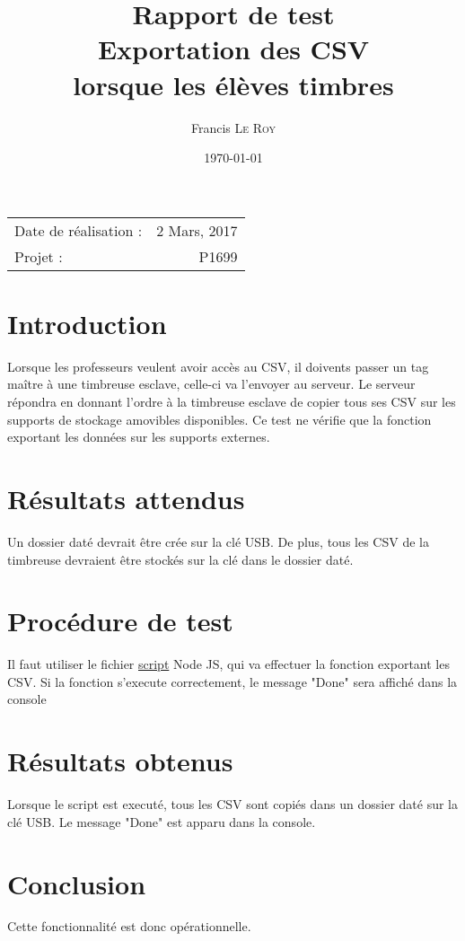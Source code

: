 \documentclass[10pt,a4paper,onecolumn]{article}
\title{Rapport de test \\ Exportation des CSV \\ lorsque les élèves timbres}
\author{Francis \textsc{Le Roy}}
\date{\today}
\begin{document}
\maketitle
\thispagestyle{fancy}

\begin{center}
\begin{tabular}{l r}
Date de réalisation : & 2 Mars, 2017 \\
Projet : & P1699 \\
\end{tabular}
\end{center}

\section{Introduction}
Lorsque les professeurs veulent avoir accès au CSV, il doivents passer un tag maître à une timbreuse esclave, celle-ci va l'envoyer au serveur. Le serveur répondra en donnant l'ordre à la timbreuse esclave de copier tous ses CSV sur les supports de stockage amovibles disponibles. Ce test ne vérifie que la fonction exportant les données sur les supports externes.
\section{Résultats attendus}
Un dossier daté devrait être crée sur la clé USB. De plus, tous les CSV de la timbreuse devraient être stockés sur la clé dans le dossier daté.
\section{Procédure de test}
Il faut utiliser le fichier \href{run:../../../test/csv_export.js}{script} Node JS, qui va effectuer la fonction exportant les CSV. Si la fonction s'execute correctement, le message "Done" sera affiché dans la console
\section{Résultats obtenus}
Lorsque le script est executé, tous les CSV sont copiés dans un dossier daté sur la clé USB. Le message "Done" est apparu dans la console.
\section{Conclusion}
Cette fonctionnalité est donc opérationnelle.
\end{document}
